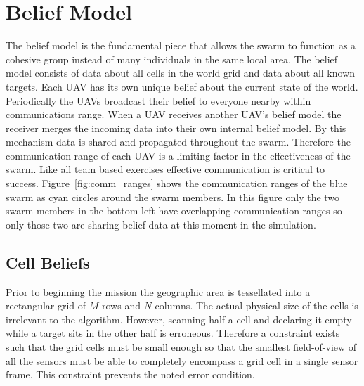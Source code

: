 \section{Belief Model}
\label{sec:uavBelief}
The belief model is the fundamental piece that allows the swarm to function as a cohesive group instead of many individuals in the same local area.  The belief model consists of data about all cells in the world grid and data about all known targets.  Each UAV has its own unique belief about the current state of the world.  Periodically the UAVs broadcast their belief to everyone nearby within communications range.  When a UAV receives another UAV's belief model the receiver merges the incoming data into their own internal belief model.  By this mechanism data is shared and propagated throughout the swarm.  Therefore the communication range of each UAV is a limiting factor in the effectiveness of the swarm.  Like all team based exercises effective communication is critical to success.  Figure~\ref{fig:comm_ranges} shows the communication ranges of the blue swarm as cyan circles around the swarm members.  In this figure only the two swarm members in the bottom left have overlapping communication ranges so only those two are sharing belief data at this moment in the simulation.



\subsection{Cell Beliefs}
Prior to beginning the mission the geographic area is tessellated into a rectangular grid of $M$ rows and $N$ columns.  The actual physical size of the cells is irrelevant to the algorithm.  However, scanning half a cell and declaring it empty while a target sits in the other half is erroneous.  Therefore a constraint exists such that the grid cells must be small enough so that the smallest field-of-view of all the sensors must be able to completely encompass a grid cell in a single sensor frame.  This constraint prevents the noted error condition.

